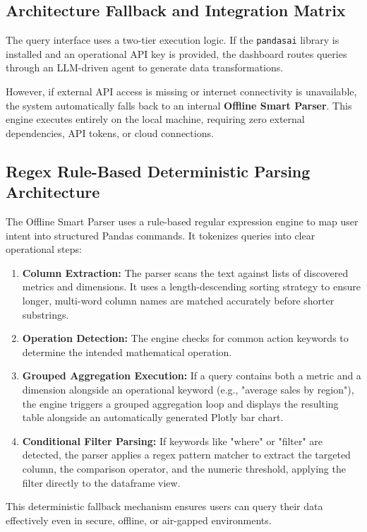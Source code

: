 \documentclass[11pt,a4paper,titlepage]{article}
\begin{document}
\subsection{Architecture Fallback and Integration Matrix}
The query interface uses a two-tier execution logic. If the \texttt{pandasai} library is installed and an operational API key is provided, the dashboard routes queries through an LLM-driven agent to generate data transformations. 

However, if external API access is missing or internet connectivity is unavailable, the system automatically falls back to an internal \textbf{Offline Smart Parser}. This engine executes entirely on the local machine, requiring zero external dependencies, API tokens, or cloud connections.

\subsection{Regex Rule-Based Deterministic Parsing Architecture}
The Offline Smart Parser uses a rule-based regular expression engine to map user intent into structured Pandas commands. It tokenizes queries into clear operational steps:
\begin{enumerate}
    \item \textbf{Column Extraction:} The parser scans the text against lists of discovered metrics and dimensions. It uses a length-descending sorting strategy to ensure longer, multi-word column names are matched accurately before shorter substrings.
    \item \textbf{Operation Detection:} The engine checks for common action keywords to determine the intended mathematical operation.
    \item \textbf{Grouped Aggregation Execution:} If a query contains both a metric and a dimension alongside an operational keyword (e.g., "average sales by region"), the engine triggers a grouped aggregation loop and displays the resulting table alongside an automatically generated Plotly bar chart.
    \item \textbf{Conditional Filter Parsing:} If keywords like "where" or "filter" are detected, the parser applies a regex pattern matcher to extract the targeted column, the comparison operator, and the numeric threshold, applying the filter directly to the dataframe view.
\end{enumerate}
This deterministic fallback mechanism ensures users can query their data effectively even in secure, offline, or air-gapped environments.
\end{document}
